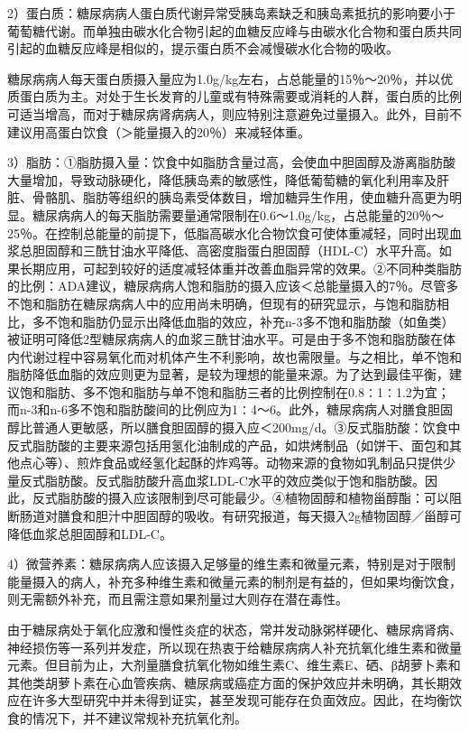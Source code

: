 2）蛋白质：糖尿病病人蛋白质代谢异常受胰岛素缺乏和胰岛素抵抗的影响要小于葡萄糖代谢。而单独由碳水化合物引起的血糖反应峰与由碳水化合物和蛋白质共同引起的血糖反应峰是相似的，提示蛋白质不会减慢碳水化合物的吸收。

糖尿病病人每天蛋白质摄入量应为1.0g/kg左右，占总能量的15％～20％，并以优质蛋白质为主。对处于生长发育的儿童或有特殊需要或消耗的人群，蛋白质的比例可适当增高，而对于糖尿病肾病病人，则应特别注意避免过量摄入。此外，目前不建议用高蛋白饮食（＞能量摄入的20％）来减轻体重。

3）脂肪：①脂肪摄入量：饮食中如脂肪含量过高，会使血中胆固醇及游离脂肪酸大量增加，导致动脉硬化，降低胰岛素的敏感性，降低葡萄糖的氧化利用率及肝脏、骨骼肌、脂肪等组织的胰岛素受体数目，增加糖异生作用，使血糖升高更为明显。糖尿病病人的每天脂肪需要量通常限制在0.6～1.0g/kg，占总能量的20％～25％。在控制总能量的前提下，低脂高碳水化合物饮食可使体重减轻，同时出现血浆总胆固醇和三酰甘油水平降低、高密度脂蛋白胆固醇（HDL-C）水平升高。如果长期应用，可起到较好的适度减轻体重并改善血脂异常的效果。②不同种类脂肪的比例：ADA建议，糖尿病病人饱和脂肪的摄入应该＜总能量摄入的7％。尽管多不饱和脂肪在糖尿病病人中的应用尚未明确，但现有的研究显示，与饱和脂肪相比，多不饱和脂肪仍显示出降低血脂的效应，补充n-3多不饱和脂肪酸（如鱼类）被证明可降低2型糖尿病病人的血浆三酰甘油水平。可是由于多不饱和脂肪酸在体内代谢过程中容易氧化而对机体产生不利影响，故也需限量。与之相比，单不饱和脂肪降低血脂的效应则更为显著，是较为理想的能量来源。为了达到最佳平衡，建议饱和脂肪、多不饱和脂肪与单不饱和脂肪三者的比例控制在0.8∶1∶1.2为宜；而n-3和n-6多不饱和脂肪酸间的比例应为1∶4～6。此外，糖尿病病人对膳食胆固醇比普通人更敏感，所以膳食胆固醇的摄入应＜200mg/d。③反式脂肪酸：饮食中反式脂肪酸的主要来源包括用氢化油制成的产品，如烘烤制品（如饼干、面包和其他点心等）、煎炸食品或经氢化起酥的炸鸡等。动物来源的食物如乳制品只提供少量反式脂肪酸。反式脂肪酸升高血浆LDL-C水平的效应类似于饱和脂肪酸。因此，反式脂肪酸的摄入应该限制到尽可能最少。④植物固醇和植物甾醇酯：可以阻断肠道对膳食和胆汁中胆固醇的吸收。有研究报道，每天摄入2g植物固醇／甾醇可降低血浆总胆固醇和LDL-C。

4）微营养素：糖尿病病人应该摄入足够量的维生素和微量元素，特别是对于限制能量摄入的病人，补充多种维生素和微量元素的制剂是有益的，但如果均衡饮食，则无需额外补充，而且需注意如果剂量过大则存在潜在毒性。

由于糖尿病处于氧化应激和慢性炎症的状态，常并发动脉粥样硬化、糖尿病肾病、神经损伤等一系列并发症，所以现在热衷于给糖尿病病人补充抗氧化维生素和微量元素。但目前为止，大剂量膳食抗氧化物如维生素C、维生素E、硒、β胡萝卜素和其他类胡萝卜素在心血管疾病、糖尿病或癌症方面的保护效应并未明确，其长期效应在许多大型研究中并未得到证实，甚至发现可能存在负面效应。因此，在均衡饮食的情况下，并不建议常规补充抗氧化剂。

